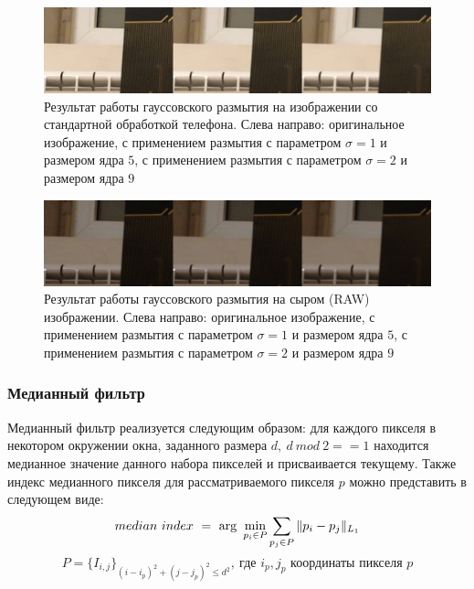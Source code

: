 \begin{figure}[h]
	\centering
	\includegraphics[width=\textwidth]{img/apple_noise_gaussian_params_comparison}
	\caption{Результат работы гауссовского размытия на изображении со стандартной обработкой телефона. Слева направо: оригинальное изображение, с применением размытия с параметром $\sigma = 1$ и размером ядра $5$, с применением размытия с параметром $\sigma = 2$ и размером ядра $9$}
	\label{fig:apple_noise_gauss_comparison}
\end{figure}

\begin{figure}[h]
	\centering
	\includegraphics[width=\textwidth]{img/real_noise_gaussian_params_comparison}
	\caption{Результат работы гауссовского размытия на сыром (RAW) изображении. Слева направо: оригинальное изображение, с применением размытия с параметром $\sigma = 1$ и размером ядра $5$, с применением размытия с параметром $\sigma = 2$ и размером ядра $9$}
	\label{fig:real_noise_gauss_comparison}
\end{figure}

\subsubsection{Медианный фильтр}

Медианный фильтр реализуется следующим образом: для каждого пикселя в некотором окружении окна, заданного размера $d,\ d\ mod\ 2 == 1$ находится медианное значение данного набора пикселей и присваивается текущему. Также индекс медианного пикселя для рассматриваемого пикселя $p$ можно представить в следующем виде:
\begin{equation}
median\ index\ =\ \arg\ \min_{p_i \in P} \sum_{p_j \in P} \Arrowvert p_i - p_j \Arrowvert_{L_1}
\end{equation}
$$P = \{I_{i, j}\}_ {(i - i_p)^2 + (j - j_p)^2 \le d^2},\ \text{где }i_p, j_p\text{ координаты пикселя }p$$

